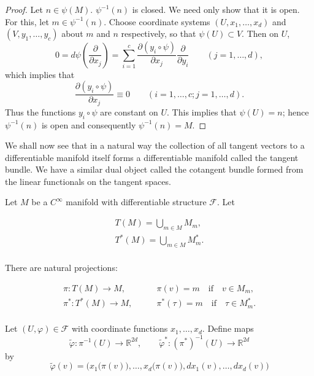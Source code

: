 \begin{proof}
	Let $n\in\psi(M)$. $\psi^{-1}(n)$ is closed. We need only show that it is open. For this, let $m\in\psi^{-1}(n)$. Choose coordinate systems $(U,x_{1},\ldots,x_{d})$ and $(V,y_{1},\ldots,y_{c})$ about $m$ and $n$ respectively, so that $\psi(U)\subset V$. Then on $U$,
	\[
		0=d\psi\left(\frac{\partial}{\partial x_{j}}\right)=\sum_{i=1}^{c}\frac{\partial(y_{i}\circ\psi)}{\partial x_{j}}\frac{\partial}{\partial y_{i}}\qquad(j=1,\ldots,d),
	\]
	which implies that
	\[
		\frac{\partial(y_{i}\circ\psi)}{\partial x_{j}}\equiv0\qquad(i=1,\ldots,c;j=1,\ldots,d).
	\]
	Thus the functions $y_{i}\circ\psi$ are constant on $U$. This implies that $\psi(U)=n$; hence $\psi^{-1}(n)$ is open and consequently $\psi^{-1}(n)=M$.
\end{proof}

We shall now see that in a natural way the collection of all tangent vectors to a differentiable manifold itself forms a differentiable manifold called the tangent bundle. We have a similar dual object called the cotangent bundle formed from the linear functionals on the tangent spaces. 

\label{thm:1.25}
Let $M$ be a $C^{\infty}$ manifold with differentiable structure $\mathcal{F}$. Let

\begin{equation}
	\label{eq:1.25:1}
	\begin{aligned}{T(M)=\bigcup_{m\in M}M_{m},}\\ {T^{*}(M)=\bigcup_{m\in M}M_{m}^{*}.}\\ \end{aligned}
\end{equation}

There are natural projections:

\begin{equation}
	\label{eq:1.25:2}
	\begin{aligned}{\pi\colon T(M)\to M,\qquad}&{{}\pi(v)=m\quad\text{if}\quad v\in M_{m},}\\ {\pi^{*}\colon T^{*}(M)\to M,\qquad}&{{}\pi^{*}(\tau)=m\quad\text{if}\quad\tau\in M_{m}^{*}.}\\ \end{aligned}
\end{equation}

Let $(U,\varphi)\in\mathcal{F}$ with coordinate functions $x_1,\ldots,x_d$. Define maps
\[
	\tilde\varphi:\pi^{-1}(U)\to\mathbb R^{2d},\qquad
	\tilde\varphi^*:(\pi^*)^{-1}(U)\to\mathbb R^{2d}
\]
by
\[
	\tilde{\varphi}(v)=\big(x_{1}\big(\pi(v)\big),\ldots,x_{d}\big(\pi(v)\big),d x_{1}(v),\ldots,d x_{d}(v)\big)
\]

